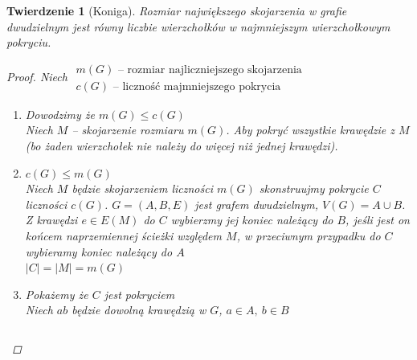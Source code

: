 \documentclass[12pt,a4paper]{article}
\newtheorem{tw}{Twierdzenie}
\theoremstyle{definition}
\begin{document}
\begin{tw}[Koniga]
Rozmiar największego skojarzenia w grafie dwudzielnym jest równy liczbie wierzchołków w najmniejszym wierzchołkowym pokryciu.
\begin{proof}
Niech $\begin{matrix}
m(G) \text{ -- rozmiar najliczniejszego skojarzenia}\\
c(G) \text{ -- liczność majmniejszego pokrycia}
\end{matrix}$
\begin{enumerate}
	\item Dowodzimy że $m(G) \leqslant c(G)$\\
	Niech $M$ -- skojarzenie rozmiaru $m(G)$. Aby pokryć wszystkie krawędzie z $M$ (bo żaden wierzchołek nie należy do więcej niż jednej krawędzi).
	\item $c(G) \leqslant m(G)$\\
	Niech $M$ będzie skojarzeniem liczności $m(G)$ skonstruujmy pokrycie $C$ liczności $c(G)$. $G = (A,B,E)$ jest grafem dwudzielnym, $V(G) = A \cup B$. \\
	Z krawędzi $e\in E(M)$ do $C$ wybierzmy jej koniec należący do $B$, jeśli jest on końcem naprzemiennej ścieżki względem $M$, w przeciwnym przypadku do $C$ wybieramy koniec należący do $A$\\
	$|C| = |M| = m(G)$
	\item Pokażemy że $C$ jest pokryciem \\
	Niech $ab$ będzie dowolną krawędzią w $G$, $a\in A,~ b\in B$ 
	\begin{tabular}{l}
	


\end{tabular}
\end{enumerate}
\end{proof}
\end{tw}
\end{document}
